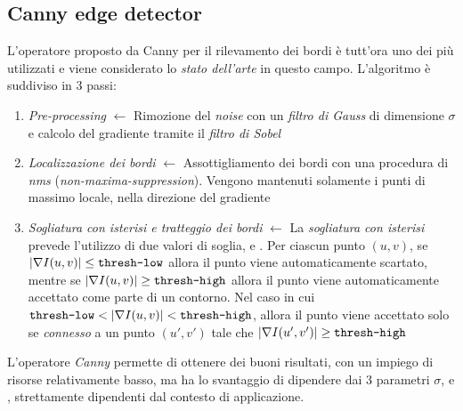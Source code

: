 \subsection{Canny edge detector}
\label{subsec:canny}
L'operatore proposto da Canny \cite{bib:canny} per il rilevamento dei bordi \`e tutt'ora uno dei pi\`u utilizzati e viene considerato lo \textit{stato dell'arte} in questo campo. L'algoritmo \`e suddiviso in 3 passi:
\begin{enumerate}
	\item \textit{Pre-processing} $\gets$ Rimozione del \textit{noise} con un \textit{filtro di Gauss} di dimensione $\sigma$ e calcolo del gradiente tramite il \textit{filtro di Sobel}
	\item \textit{Localizzazione dei bordi} $\gets$ Assottigliamento dei bordi con una procedura di \textit{nms} (\textit{non-maxima-suppression}). Vengono mantenuti solamente i punti di massimo locale, nella direzione del gradiente
	\item \textit{Sogliatura con isterisi e tratteggio dei bordi} $\gets$ La \textit{sogliatura con isterisi} prevede l'utilizzo di due valori di soglia,  e . Per ciascun punto $(u, v)$, se $|\nabla I(u, v)| \leq \texttt{thresh-low}$ allora il punto viene automaticamente scartato, mentre se $|\nabla I(u, v)| \geq \texttt{thresh-high}$ allora il punto viene automaticamente accettato come parte di un contorno. Nel caso in cui $\texttt{thresh-low} < |\nabla I(u, v)| < \texttt{thresh-high}$, allora il punto viene accettato solo se \textit{connesso} a un punto $(u', v')$ tale che $|\nabla I(u', v')| \geq \texttt{thresh-high}$
\end{enumerate}\par
L'operatore \textit{Canny} permette di ottenere dei buoni risultati, con un impiego di risorse relativamente basso, ma ha lo svantaggio di dipendere dai 3 parametri $\sigma$,  e , strettamente dipendenti dal contesto di applicazione.
